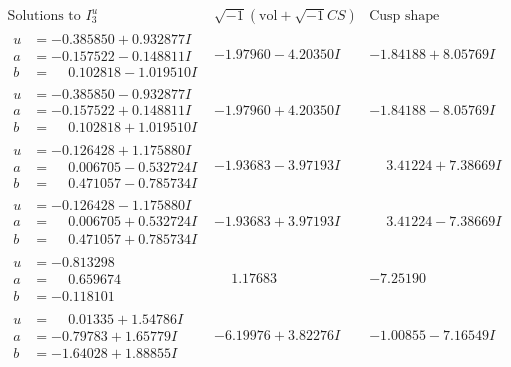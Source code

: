 \documentclass[1p]{elsarticle_modified}
\theoremstyle{definition}
\newcommand{\I}{\sqrt{-1}}
\begin{document}
$$\begin{array}{c|c|c}  
\text{Solutions to }I^u_{3}& \I (\text{vol} + \sqrt{-1}CS) & \text{Cusp shape}\\
 \hline 
\begin{aligned}
u &= -0.385850 + 0.932877 I \\
a &= -0.157522 - 0.148811 I \\
b &= \phantom{-}0.102818 - 1.019510 I\end{aligned}
 & -1.97960 - 4.20350 I & -1.84188 + 8.05769 I \\ \hline\begin{aligned}
u &= -0.385850 - 0.932877 I \\
a &= -0.157522 + 0.148811 I \\
b &= \phantom{-}0.102818 + 1.019510 I\end{aligned}
 & -1.97960 + 4.20350 I & -1.84188 - 8.05769 I \\ \hline\begin{aligned}
u &= -0.126428 + 1.175880 I \\
a &= \phantom{-}0.006705 - 0.532724 I \\
b &= \phantom{-}0.471057 - 0.785734 I\end{aligned}
 & -1.93683 - 3.97193 I & \phantom{-}3.41224 + 7.38669 I \\ \hline\begin{aligned}
u &= -0.126428 - 1.175880 I \\
a &= \phantom{-}0.006705 + 0.532724 I \\
b &= \phantom{-}0.471057 + 0.785734 I\end{aligned}
 & -1.93683 + 3.97193 I & \phantom{-}3.41224 - 7.38669 I \\ \hline\begin{aligned}
u &= -0.813298\phantom{ +0.000000I} \\
a &= \phantom{-}0.659674\phantom{ +0.000000I} \\
b &= -0.118101\phantom{ +0.000000I}\end{aligned}
 & \phantom{-}1.17683\phantom{ +0.000000I} & -7.25190\phantom{ +0.000000I} \\ \hline\begin{aligned}
u &= \phantom{-}0.01335 + 1.54786 I \\
a &= -0.79783 + 1.65779 I \\
b &= -1.64028 + 1.88855 I\end{aligned}
 & -6.19976 + 3.82276 I & -1.00855 - 7.16549 I \\ \hline\begin{aligned}

\end{aligned}
\end{array}$$
\end{document}
